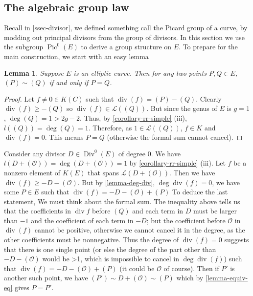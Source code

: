 \documentclass[12pt]{article}
\newtheorem{lemma}{Lemma}[subsection]
\theoremstyle{remark}
\theoremstyle{definition}
\newcommand{\Div}[0]{\operatorname{Div}}
\newcommand{\pdiv}[0]{\operatorname{div}}
\newcommand{\Pic}[0]{\operatorname{Pic}}
\begin{document}
        
        
        
    \subsection{The algebraic group law}\label{ssec-alg-group}
        Recall in \autoref{ssec-divisor}, we defined something call the Picard group of a curve, by modding out principal divisors from the group of divisors. In this section we use the subgroup $\Pic^0(E)$ to derive a group structure on $E$. To prepare for the main construction, we start with an easy lemma
        \begin{lemma}\label{lemma-equiv-eq}
            Suppose $E$ is an elliptic curve. Then for any two points $P, Q\in E$, $(P)\sim (Q)$ if and only if $P=Q$.
        \end{lemma}
        \begin{proof}
            Let $f\neq 0\in K(C)$ such that $\pdiv(f)=(P)-(Q)$. Clearly $\pdiv(f)\geqslant -(Q)$ so $\pdiv(f)\in\mathcal L((Q))$. But since the genus of $E$ is $g=1$, $\deg (Q)=1>2g-2$. Thus, by \autoref{corollary-rr-simple} (iii), $l((Q))=\deg (Q)=1$. Therefore, as $1\in \mathcal L((Q))$, $f\in K$ and $\pdiv(f)=0$. This means $P=Q$ (otherwise the formal sum cannot cancel).
        \end{proof}
        Consider any divisor $D\in \Div^0(E)$ of degree $0$. We have $l(D+(\mathcal O))=\deg (D+(\mathcal O))=1$ by \autoref{corollary-rr-simple} (iii). Let $f$ be a nonzero element of $K(E)$ that spans $\mathcal L(D+(\mathcal O))$. Then we have $\pdiv(f)\geqslant -D-(\mathcal O)$. But by \autoref{lemma-deg-div}, $\deg\pdiv(f)=0$, we have some $P\in E$ such that $\pdiv(f)=-D-(\mathcal O)+(P)$ To deduce the last statement, We must think about the formal sum. The inequality above tells us that the coefficients in $\pdiv f$ before $(Q)$ and each term in $D$ must be larger than $-1$ and the coefficient of each term in $-D$; but the coefficient before $\mathcal O$ in $\pdiv(f)$ cannot be positive, otherwise we cannot cancel it in the degree, as the other coefficients must be nonnegative. Thus the degree of $\pdiv(f)=0$ suggests that there is one single point (or else the degree of the part other than $-D-(\mathcal O )$ would be >1, which is impossible to cancel in $\deg\pdiv(f)$) such that $\pdiv(f)=-D-(\mathcal O)+(P)$ (it could be $\mathcal O$ of course). Then if $P'$ is another such point, we have $(P')\sim D+(\mathcal O)\sim (P)$ which by \autoref{lemma-equiv-eq} gives $P=P'$.
        
\end{document}
